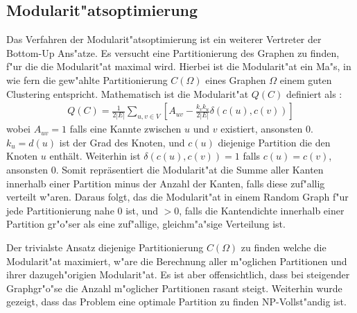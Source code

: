 \documentclass[journal]{vgtc}
\begin{document}
  
  \subsection{Modularit"atsoptimierung}
    \label{sec:modularity}
    Das Verfahren der Modularit"atsoptimierung ist ein weiterer Vertreter der Bottom-Up Ans"atze. Es versucht eine Partitionierung
    des Graphen zu finden, f"ur die die Modularit"at maximal wird. Hierbei ist die Modularit"at ein Ma"s, in wie fern die gew"ahlte
    Partitionierung $C(\Omega)$ eines Graphen $\Omega$ einem guten Clustering entspricht.
    Mathematisch ist die Modularit"at $Q(C)$ definiert als \cite{modularity}:
    \begin{align}
      Q(C)=\frac{1}{2|E|}\sum\limits_{u,v \in V}\left[ A_{uv} - \frac {k_vk_u}{2|E|}\delta \left( c(u), c(v)\right) \right]
    \end{align}
    wobei $A_{uv}=1$ falls eine Kannte zwischen $u$ und $v$ existiert, ansonsten 0. $k_u = d(u)$ ist der Grad des Knoten, und
    $c(u)$ diejenige Partition die den Knoten $u$ enthält. Weiterhin ist $\delta \left(c(u),c(v)\right)=1$ falls $c(u)=c(v)$,
    ansonsten 0.
    Somit repräsentiert die Modularit"at die Summe aller Kanten innerhalb einer Partition minus der Anzahl der Kanten, falls diese 
    zuf"allig verteilt w"aren. Daraus folgt, das die Modularit"at in einem Random Graph f"ur jede Partitionierung nahe $0$ ist,
    und $>0$, falls die Kantendichte innerhalb einer Partition gr"o"ser als eine zuf"allige, gleichm"a"sige Verteilung ist.
    
    Der trivialste Ansatz diejenige Partitionierung $C(\Omega)$ zu finden welche die Modularit"at maximiert, w"are die Berechnung
    aller m"oglichen Partitionen und ihrer dazugeh"origien Modularit"at. Es ist aber offensichtlich, dass bei steigender 
    Graphgr"o"se die Anzahl m"oglicher Partitionen rasant steigt. Weiterhin wurde gezeigt\cite{modularity_nphard}, dass das Problem
    eine optimale Partition zu finden NP-Vollst"andig ist.
    
\end{document}
